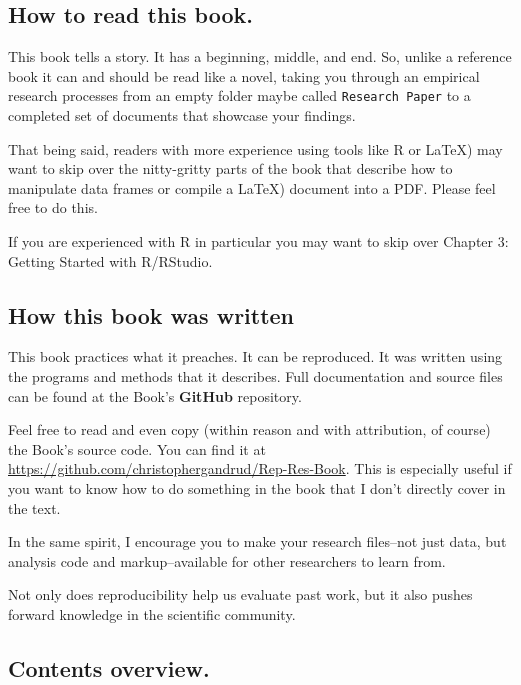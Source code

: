 \documentclass[ChapterTOCs,krantz1]{krantz}\usepackage{graphicx, color}
\begin{document}
\subsection{How to read this book.}

This book tells a story. It has a beginning, middle, and end. So, unlike
a reference book it can and should be read like a novel, taking you
through an empirical research processes from an empty folder maybe
called \texttt{Research Paper} to a completed set of documents that
showcase your findings.

That being said, readers with more experience using tools like
R or \LaTeX) may want to
skip over the nitty-gritty parts of the book that describe how to
manipulate data frames or compile a \LaTeX) document into a PDF. Please feel free to do
this.

If you are experienced with R in particular you may want to
skip over Chapter 3: Getting Started with R/RStudio.

\subsection{How this book was written}

This book practices what it preaches. It can be reproduced. It was
written using the programs and methods that it describes. Full
documentation and source files can be found at the Book's
\textbf{GitHub} repository.

Feel free to read and even copy (within reason and with attribution, of
course) the Book's source code. You can find it at
\url{https://github.com/christophergandrud/Rep-Res-Book}. This is
especially useful if you want to know how to do something in the book
that I don't directly cover in the text.

In the same spirit, I encourage you to make your research files--not
just data, but analysis code and markup--available for other researchers
to learn from.

Not only does reproducibility help us evaluate past work, but it also
pushes forward knowledge in the scientific community.

\subsection{Contents overview.}

\end{document}
